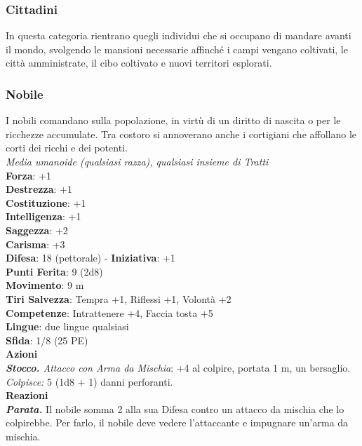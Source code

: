 \begin{multicols}{2}
\subsubsection{Cittadini}

In questa categoria rientrano quegli individui che si occupano di mandare avanti il mondo, svolgendo le mansioni necessarie affinché i campi vengano coltivati, le città amministrate, il cibo coltivato e nuovi territori esplorati.

\subsubsection{Nobile}

I nobili comandano sulla popolazione, in virtù di un diritto di nascita o per le ricchezze accumulate. Tra costoro si annoverano anche i cortigiani che affollano le corti dei ricchi e dei potenti.\\
\emph{Media umanoide (qualsiasi razza), qualsiasi insieme di Tratti}\\
\textbf{Forza}: +1\\
\textbf{Destrezza}: +1\\
\textbf{Costituzione}: +1\\
\textbf{Intelligenza}: +1\\
\textbf{Saggezza}: +2\\
\textbf{Carisma}: +3\\
\textbf{Difesa}: 18 (pettorale) - \textbf{Iniziativa}: +1\\
\textbf{Punti Ferita}: 9 (2d8)\\
\textbf{Movimento}: 9 m\\
\textbf{Tiri Salvezza}: Tempra +1, Riflessi +1, Volontà +2 \\
\textbf{Competenze}: Intrattenere +4, Faccia tosta +5\\
\textbf{Lingue}: due lingue qualsiasi\\
\textbf{Sfida}: 1/8 (25 PE)\smallskip\\
\smallskip\textbf{Azioni}\\
\emph{\textbf{Stocco.} Attacco con Arma da Mischia}: +4 al colpire, portata 1 m, un bersaglio.\\
\emph{Colpisce:} 5 (1d8 + 1) danni perforanti.\\
\textbf{Reazioni}\\
\emph{\textbf{Parata.}} Il nobile somma 2 alla sua Difesa contro un attacco da mischia che lo colpirebbe. Per farlo, il nobile deve vedere l'attaccante e impugnare un'arma da mischia.\\


\end{multicols}
